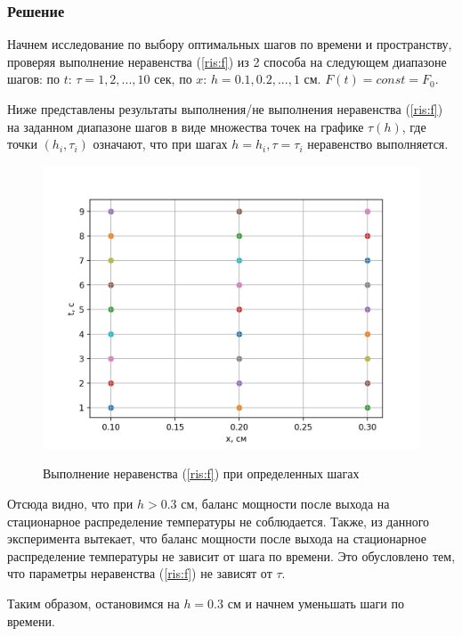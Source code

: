 \documentclass[a4paper,12pt]{article}
\begin{document}
	\subsubsection*{Решение}
	
	Начнем исследование по выбору оптимальных шагов по времени и пространству, проверяя выполнение неравенства (\ref{ris:f}) из 2 способа на следующем диапазоне шагов: по $t$: $\tau = 1, 2, ..., 10$ сек, по $x$: $h = 0.1, 0.2, ..., 1$ см. $F(t) = const = F_0$.
	
	Ниже представлены результаты выполнения/не выполнения неравенства (\ref{ris:f}) на заданном диапазоне шагов в виде множества точек на графике $\tau(h)$, где точки $(h_i, \tau_i)$ означают, что при шагах $h = h_i, \tau = \tau_i$ неравенство выполняется.
	
	\begin{figure}[h!]
		\begin{center}
			{\includegraphics[scale = 0.6]{1.png}}
			\label{ris:1}
		\end{center}
		\caption{Выполнение неравенства (\ref{ris:f}) при определенных шагах}
	\end{figure}
	
	Отсюда видно, что при $h > 0.3$ см, баланс мощности после выхода на стационарное распределение температуры не соблюдается. Также, из данного эксперимента вытекает, что баланс мощности после выхода на стационарное распределение температуры не зависит от шага по времени. Это обусловлено тем, что параметры неравенства (\ref{ris:f}) не зависят от $\tau$.
	
	Таким образом, остановимся на $h = 0.3$ см и начнем уменьшать шаги по времени.
	
\end{document}
